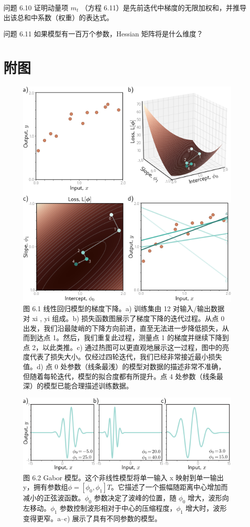 问题 6.10 证明动量项 \(m_t\) （方程 6.11）是先前迭代中梯度的无限加权和，并推导出该总和中系数（权重）的表达式。

问题 6.11 如果模型有一百万个参数，Hessian 矩阵将是什么维度？

\section{附图}

\begin{figure}[ht!]
\centering
\includegraphics[width=0.7\linewidth]{png/chapter6/TrainLRMin.png}
\caption{图 6.1 线性回归模型的梯度下降。a) 训练集由 12 对输入/输出数据对 {xi , yi} 组成。b) 损失函数图展示了梯度下降的迭代过程。从点 0 出发，我们沿最陡峭的下降方向前进，直至无法进一步降低损失，从而到达点 1。然后，我们重复此过程，测量点 1 的梯度并继续下降到点 2，以此类推。c) 通过热图可以更直观地展示这一过程，图中的亮度代表了损失大小。仅经过四轮迭代，我们已经非常接近最小损失值。d) 点 0 处参数（线条最浅）的模型对数据的描述非常不准确，但随着每轮迭代，模型的拟合度都有所提升。点 4 处参数（线条最深）的模型已能合理描述训练数据。}
\end{figure}

\begin{figure}[ht!]
\centering
\includegraphics[width=0.7\linewidth]{png/chapter6/TrainGaborModel.png}
\caption{图 6.2 Gabor 模型。这个非线性模型将单一输入 x 映射到单一输出 y，拥有参数组\(\phi= [\phi_0 , \phi_1]T\)。它描述了一个振幅随距离中心增加而减小的正弦波函数。\(\phi_0\) 参数决定了波峰的位置，随 \(\phi_0\) 增大，波形向左移动。\(\phi_1\) 参数控制波形相对于中心的压缩程度，\(\phi_1\) 增大时，波形变得更窄。a–c) 展示了具有不同参数的模型。}
\end{figure}

